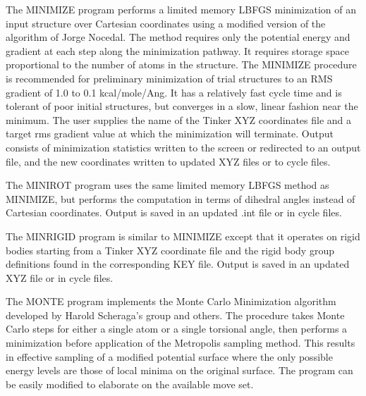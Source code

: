 \documentclass[letterpaper,11pt,english]{sphinxmanual}
\begin{document}

The MINIMIZE program performs a limited memory L\sphinxhyphen{}BFGS minimization of an input structure over Cartesian coordinates using a modified version of the algorithm of Jorge Nocedal. The method requires only the potential energy and gradient at each step along the minimization pathway. It requires storage space proportional to the number of atoms in the structure. The MINIMIZE procedure is recommended for preliminary minimization of trial structures to an RMS gradient of 1.0 to 0.1 kcal/mole/Ang. It has a relatively fast cycle time and is tolerant of poor initial structures, but converges in a slow, linear fashion near the minimum. The user supplies the name of the Tinker XYZ coordinates file and a target rms gradient value at which the minimization will terminate. Output consists of minimization statistics written to the screen or redirected to an output file, and the new coordinates written to updated XYZ files or to cycle files.


The MINIROT program uses the same limited memory L\sphinxhyphen{}BFGS method as MINIMIZE, but performs the computation in terms of dihedral angles instead of Cartesian coordinates. Output is saved in an updated .int file or in cycle files.


The MINRIGID program is similar to MINIMIZE except that it operates on rigid bodies starting from a Tinker XYZ coordinate file and the rigid body group definitions found in the corresponding KEY file. Output is saved in an updated XYZ file or in cycle files.


The MONTE program implements the Monte Carlo Minimization algorithm developed by Harold Scheraga’s group and others. The procedure takes Monte Carlo steps for either a single atom or a single torsional angle, then performs a minimization before application of the Metropolis sampling method. This results in effective sampling of a modified potential surface where the only possible energy levels are those of local minima on the original surface. The program can be easily modified to elaborate on the available move set.

\end{document}
